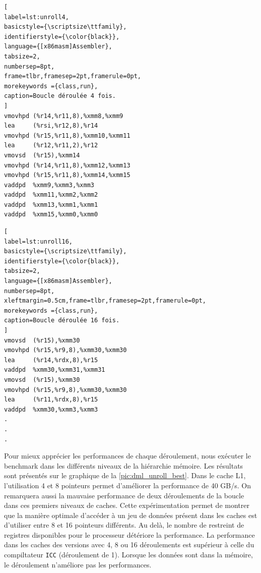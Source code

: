 \begin{minipage}{.45\textwidth}
\begin{lstlisting}[
label=lst:unroll4,
basicstyle={\scriptsize\ttfamily},
identifierstyle={\color{black}},
language={[x86masm]Assembler},
tabsize=2,
numbersep=8pt,
frame=tlbr,framesep=2pt,framerule=0pt,
morekeywords ={class,run},
caption=Boucle déroulée 4 fois.
]
vmovhpd (%r14,%r11,8),%xmm8,%xmm9
lea     (%rsi,%r12,8),%r14
vmovhpd (%r15,%r11,8),%xmm10,%xmm11
lea     (%r12,%r11,2),%r12
vmovsd  (%r15),%xmm14
vmovhpd (%r14,%r11,8),%xmm12,%xmm13
vmovhpd (%r15,%r11,8),%xmm14,%xmm15
vaddpd  %xmm9,%xmm3,%xmm3
vaddpd  %xmm11,%xmm2,%xmm2
vaddpd  %xmm13,%xmm1,%xmm1
vaddpd  %xmm15,%xmm0,%xmm0
\end{lstlisting}
\end{minipage}%
\hfill
%
\begin{minipage}{.45\textwidth}
\begin{lstlisting}[
label=lst:unroll16,
basicstyle={\scriptsize\ttfamily},
identifierstyle={\color{black}},
tabsize=2,
language={[x86masm]Assembler},
numbersep=8pt,
xleftmargin=0.5cm,frame=tlbr,framesep=2pt,framerule=0pt,
morekeywords ={class,run},
caption=Boucle déroulée 16 fois.
]
vmovsd  (%r15),%xmm30
vmovhpd (%r15,%r9,8),%xmm30,%xmm30
lea     (%r14,%rdx,8),%r15
vaddpd  %xmm30,%xmm31,%xmm31
vmovsd  (%r15),%xmm30
vmovhpd (%r15,%r9,8),%xmm30,%xmm30
lea     (%r11,%rdx,8),%r15
vaddpd  %xmm30,%xmm3,%xmm3
. 
. 
. 
\end{lstlisting}
\end{minipage}
    
    
    Pour mieux apprécier les performances de chaque déroulement, nous exécuter le benchmark dans les différents niveaux de la hiérarchie mémoire. Les résultats sont présentés sur le graphique de la \autoref{pic:dml_unroll_best}. Dans le cache L1, l'utilisation 4 et 8 pointeurs permet d'améliorer la performance de 40 GB/s. On remarquera aussi la mauvaise performance de deux déroulements de la boucle dans ces premiers niveaux de caches. Cette expérimentation permet de montrer que la manière optimale d'accéder à un jeu de données présent dans les caches est d'utiliser entre 8 et 16 pointeurs différents. Au delà, le nombre de restreint de registres disponibles pour le processeur détériore la performance. La performance dans les caches des versions avec 4, 8 ou 16 déroulements est supérieur à celle du compiltateur \verb|ICC| (déroulement de 1). Lorsque les données sont dans la mémoire, le déroulement n'améliore pas les performances. 
    
